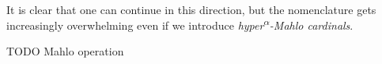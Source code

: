 It is clear that one can continue in this direction, but the nomenclature gets increasingly overwhelming even if we introduce \emph{hyper\textsuperscript{$\alpha$}-Mahlo cardinals}.

TODO Mahlo operation

\begin{comment} %

We have transcended $\sf{ZFC}$, but that is just a~start. Naturally, we could go on and consider the next inaccessible cardinal, which is inaccessible with respect to the theory $\sf{ZFC} + \exists \kappa (\langle V_\kappa, \in \rangle~\models~\sf{ZFC})$. But let's try to find a faster way up, informally at first. 

Since we can find an inaccessible set larger than any chosen set $M_0$, it is clear that there are arbitrarily large inaccessible cardinals in $V$, they are ``unbounded''\footnote{The notion is formally defined for sets, but the meaning should be obvious.} in $V$. If $V$ were a cardinal, we could say that there are $V$ inaccessible cardinals less than $V$, but this statement of course makes no sense in set theory as is because $V$ is not a set. But being more careful, we could find a property that can be formalized in second-order logic and reflect it to an initial segment of $V$. That would allow us to construct large cardinals more efficiently than by adding inaccessibles one by one. The property we are looking for ought to look like something like this (the following statement is not a mathematical  statement in a strict sense):
\begin{equation}
\begin{gathered}
\kappa \mbox{ is an inaccessible cardinal and}\\
\mbox{there are }\kappa\mbox{ inaccessible cardinals }\mu\ <\ \kappa
\end{gathered}
\end{equation}
This is in fact a fixed-point type of statement. We shall call those cardinals hyper-inaccessible. Now consider the following definition.

\begin{definition}{$0$-inaccessible Cardinal}\\
A cardinal $\kappa$ is $0$-inaccessible if it is inaccessible.
\end{definition}
We can define \emph{$\alpha$-weakly-inaccessible} cardinals analogously with the only difference that those are limit, not strongly limit.


\end{comment}
